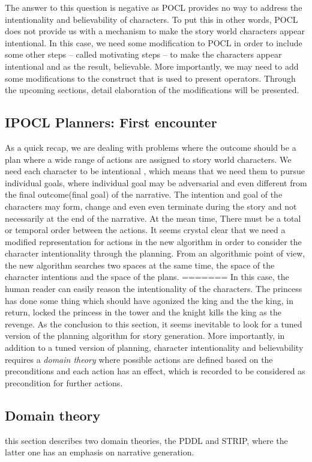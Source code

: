 \documentclass[english]{tktltiki}
\begin{document}
The answer to this question is negative as POCL provides no way to address the intentionality and believability of characters. To put this in other words, POCL does not provide us with a mechanism to make the story world characters appear intentional. In this case, we need some modification to POCL in order to include some other steps -- called motivating steps -- to make the characters appear intentional and as the result, believable. More importantly, we may need to add some modifications to the construct that is used to present operators. Through the upcoming sections, detail elaboration of the modifications will be presented.
\subsection{IPOCL Planners: First encounter}
As a quick recap, we are dealing with problems where the outcome should be a plan where a wide range of actions are assigned to story world characters. We need each character to be intentional , which means that we need them to pursue individual goals, where individual goal may be adversarial and even different from the final outcome(final goal) of the narrative. The intention and goal of the characters may form, change and even even terminate during the story and not necessarily at the end of the narrative. At the mean time, There must be a total or temporal order between the actions. 
It seems crystal clear that we need a modified representation for actions in the new algorithm in order to consider the character intentionality through the planning. From an algorithmic point of view, the new algorithm searches two spaces at the same time, the space of the character intentions and the space of the plans. 
=======
In this case, the human reader can easily reason the intentionality of the characters. The princess has done some thing which should have agonized the king and the the king, in return, locked the princess in the tower and the knight kills the king as the revenge.
As the conclusion to this section, it seems inevitable to look for a tuned version of the planning algorithm for story generation. More importantly, in addition to a tuned version of planning, character intentionality and believability requires a \textit{domain theory} where possible actions are defined based on the preconditions and each action has an effect, which is recorded to be considered as precondition for further actions.
\subsection{Domain theory}
this section describes two domain theories, the PDDL and STRIP, where the latter one has an emphasis on narrative generation.  
\end{document}
